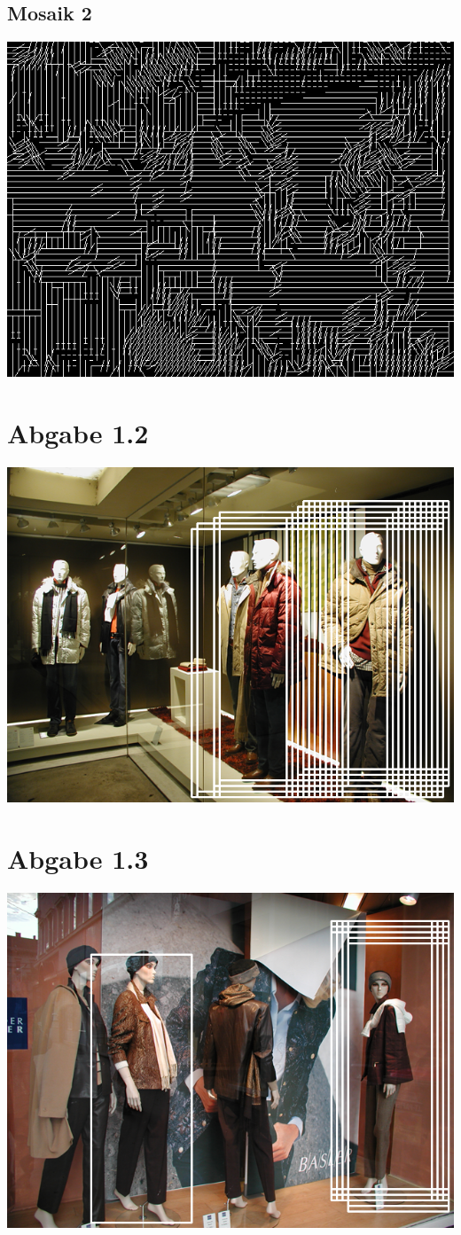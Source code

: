 \documentclass[12pt]{article}
\begin{document}
\subsection{Mosaik 2}

\includegraphics[scale=0.6]{blocks.png}


\section{Abgabe 1.2}

\includegraphics[scale=0.6]{people1-2.png}

\section{Abgabe 1.3}

\includegraphics[scale=0.6]{people2-2.png}
\end{document}
